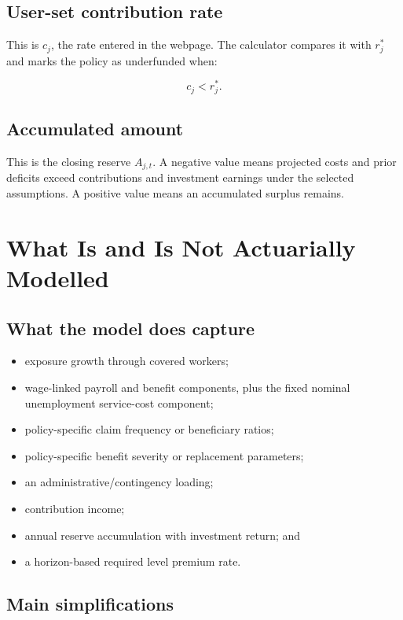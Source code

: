 \subsection{User-set contribution rate}

This is $c_j$, the rate entered in the webpage. The calculator compares it with $r_j^{\ast}$ and marks the policy as underfunded when:

\begin{equation}
c_j<r_j^{\ast}.
\end{equation}

\subsection{Accumulated amount}

This is the closing reserve $A_{j,t}$. A negative value means projected costs and prior deficits exceed contributions and investment earnings under the selected assumptions. A positive value means an accumulated surplus remains.

\section{What Is and Is Not Actuarially Modelled}

\subsection{What the model does capture}

\begin{itemize}
  \item exposure growth through covered workers;
  \item wage-linked payroll and benefit components, plus the fixed nominal unemployment service-cost component;
  \item policy-specific claim frequency or beneficiary ratios;
  \item policy-specific benefit severity or replacement parameters;
  \item an administrative/contingency loading;
  \item contribution income;
  \item annual reserve accumulation with investment return; and
  \item a horizon-based required level premium rate.
\end{itemize}

\subsection{Main simplifications}

